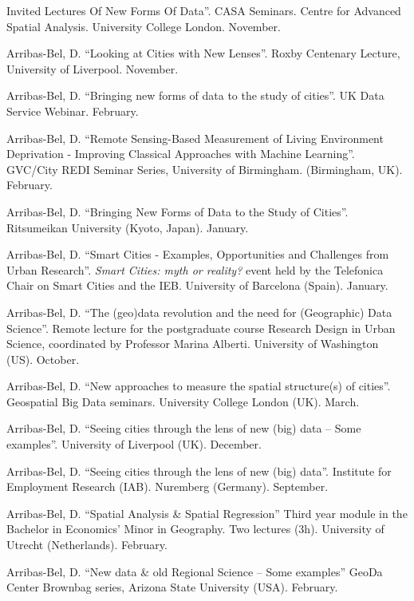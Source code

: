 \documentclass[12pt,2up]{article}
\begin{document}
\begin{cv}{}
\begin{cvlist}{Invited Lectures}
    Of New Forms Of Data''. CASA Seminars. Centre for Advanced Spatial
    Analysis. University College London.  November.
\item[] Arribas-Bel, D. ``Looking at Cities with New Lenses''. Roxby
    Centenary Lecture, University of Liverpool. November.
\item[] Arribas-Bel, D. ``Bringing new forms of data to the study of cities''. 
    UK Data Service Webinar. February.
\item[] Arribas-Bel, D. ``Remote Sensing-Based Measurement of Living
    Environment Deprivation - Improving Classical Approaches with Machine Learning''. 
    GVC/City REDI Seminar Series, University of Birmingham. (Birmingham, UK). February.
\item[] Arribas-Bel, D. ``Bringing New Forms of Data to the Study of Cities''. 
    Ritsumeikan University (Kyoto, Japan). January.
\item[2016] Arribas-Bel, D. ``Smart Cities - Examples, Opportunities and
    Challenges from Urban Research''. \textit{Smart Cities: myth or reality?}
    event held by the Telefonica Chair on Smart Cities and the IEB. University
    of Barcelona (Spain). January.
\item[2015] Arribas-Bel, D. ``The (geo)data revolution and the need for
    (Geographic) Data Science''. Remote lecture for the postgraduate course 
    Research Design in Urban Science, coordinated by Professor Marina Alberti.
    University of Washington (US). October.

\item[] Arribas-Bel, D. ``New approaches to measure the spatial
    structure(s) of cities''. Geospatial Big Data seminars.
    University College London (UK). March.

\item[2014] Arribas-Bel, D. ``Seeing cities through the lens of new (big) data
    -- Some examples''.
    University of Liverpool (UK). December.

\item[] Arribas-Bel, D. ``Seeing cities through the lens of new (big)
    data''.
    Institute for Employment Research (IAB). Nuremberg (Germany). September.

\item[] Arribas-Bel, D. ``Spatial Analysis \& Spatial Regression'' 
    Third year module in the Bachelor in Economics' Minor in Geography. Two
    lectures (3h).
    University of Utrecht (Netherlands). February.

\item[] Arribas-Bel, D. ``New data \& old Regional Science --
    Some examples'' GeoDa Center Brownbag series,
    Arizona State University (USA). February.


\end{cvlist}
\end{cv}
\end{document}
